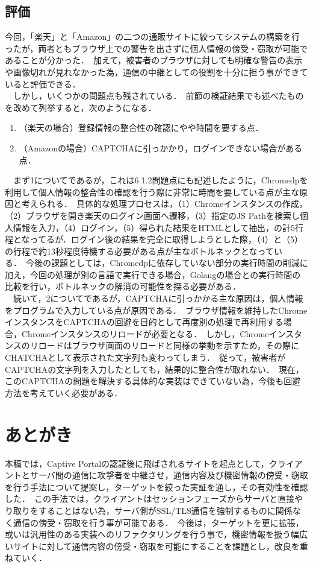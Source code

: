 \documentclass[dvipdfmx,twocolumn,9pt]{jsarticle}
\begin{document}
        \subsection{評価}
            今回，「楽天」と「Amazon」の二つの通販サイトに絞ってシステムの構築を行ったが，両者ともブラウザ上での警告を出さずに個人情報の傍受・窃取が可能であることが分かった．\
            加えて，被害者のブラウザに対しても明確な警告の表示や画像切れが見れなかった為，通信の中継としての役割を十分に担う事ができていると評価できる．\\
            　しかし，いくつかの問題点も残されている．\
            前節の検証結果でも述べたものを改めて列挙すると，次のようになる．\
            \begin{enumerate}
                \item （楽天の場合）登録情報の整合性の確認にやや時間を要する点．
                \item （Amazonの場合）CAPTCHAに引っかかり，ログインできない場合がある点．
            \end{enumerate}
            　まず1についてであるが，これは6.1.2問題点にも記述したように，Chromedpを利用して個人情報の整合性の確認を行う際に非常に時間を要している点が主な原因と考えられる．\
            具体的な処理プロセスは，（1）Chromeインスタンスの作成，（2）ブラウザを開き楽天のログイン画面へ遷移，（3）指定のJS Pathを検索し個人情報を入力，（4）ログイン，（5）得られた結果をHTMLとして抽出，の計5行程となってるが．ログイン後の結果を完全に取得しようとした際，（4）と（5）の行程で約13秒程度待機する必要がある点が主なボトルネックとなっている．\
            今後の課題としては，Chromedpに依存していない部分の実行時間の削減に加え，今回の処理が別の言語で実行できる場合，Golangの場合との実行時間の比較を行い，ボトルネックの解消の可能性を探る必要がある．\\
            　続いて，2についてであるが，CAPTCHAに引っかかる主な原因は，個人情報をプログラムで入力している点が原因である．\
            ブラウザ情報を維持したChromeインスタンスをCAPTCHAの回避を目的として再度別の処理で再利用する場合，Chromeインスタンスのリロードが必要となる．\
            しかし，Chromeインスタンスのリロードはブラウザ画面のリロードと同様の挙動を示すため，その際にCHATCHAとして表示された文字列も変わってしまう．\
            従って，被害者がCAPTCHAの文字列を入力したとしても，結果的に整合性が取れない．\
            現在，このCAPTCHAの問題を解決する具体的な実装はできていない為，今後も回避方法を考えていく必要がある．\
    
    \section{あとがき}
        本稿では，Captive Portalの認証後に飛ばされるサイトを起点として，クライアントとサーバ間の通信に攻撃者を中継させ，通信内容及び機密情報の傍受・窃取を行う手法について提案し，ターゲットを絞った実証を通し，その有効性を確認した．\
        この手法では，クライアントはセッションフェーズからサーバと直接やり取りをすることはない為，サーバ側がSSL/TLS通信を強制するものに関係なく通信の傍受・窃取を行う事が可能である．\
        今後は，ターゲットを更に拡張，或いは汎用性のある実装へのリファクタリングを行う事で，機密情報を扱う幅広いサイトに対して通信内容の傍受・窃取を可能にすることを課題とし，改良を重ねていく．
\end{document}
